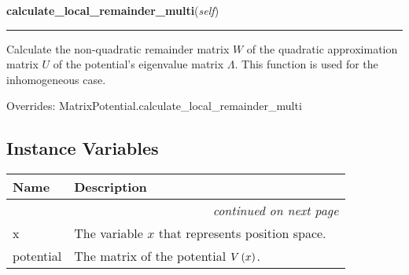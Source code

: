 \hspace{.8\funcindent}\begin{boxedminipage}{\funcwidth}

    \raggedright \textbf{calculate\_local\_remainder\_multi}(\textit{self})

    \vspace{-1.5ex}

    \rule{\textwidth}{0.5\fboxrule}
\setlength{\parskip}{2ex}
    Calculate the non-quadratic remainder matrix $W$ of the quadratic
    approximation matrix $U$ of the potential's eigenvalue matrix
    $\Lambda$. This function is used for the inhomogeneous
    case.

\setlength{\parskip}{1ex}


      Overrides: MatrixPotential.calculate\_local\_remainder\_multi

    \end{boxedminipage}

\newpage


  \subsection{Instance Variables}

    \vspace{-1cm}
\hspace{\varindent}\begin{longtable}{|p{\varnamewidth}|p{\vardescrwidth}|l}
\cline{1-2}
\cline{1-2} \centering \textbf{Name} & \centering \textbf{Description}& \\
\cline{1-2}
\endhead\cline{1-2}\multicolumn{3}{r}{\small\textit{continued on next page}}\\\endfoot\cline{1-2}
\endlastfoot\raggedright x\- & The variable $x$ that represents position space.&\\
\cline{1-2}
\raggedright p\-o\-t\-e\-n\-t\-i\-a\-l\- & The matrix of the potential $V\left( x \right)$.&\\
\cline{1-2}
\end{longtable}

